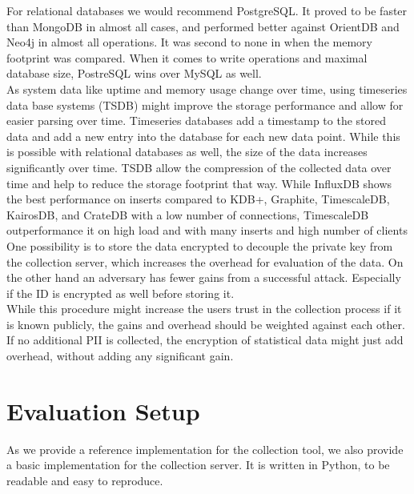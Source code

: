 For relational databases we would recommend PostgreSQL\cite{group_postgresql_2021}. It proved to be faster than MongoDB\cite{makris_mongodb_2020} in almost all cases, and performed better against OrientDB and Neo4j in almost all operations\cite{noauthor_benchmark_2018}. It was second to none in \cite{noauthor_benchmark_2018} when the memory footprint was compared.
When it comes to write operations and maximal database size, PostreSQL wins over MySQL as well\cite{noauthor_mysql_2021}.\\
As system data like uptime and memory usage change over time, using timeseries data base systems (TSDB) might improve the storage performance and allow for easier parsing over time. Timeseries databases add a timestamp to the stored data and add a new entry into the database for each new data point. While this is possible with relational databases as well, the size of the data increases significantly over time. TSDB allow the compression of the collected data over time and help to reduce the storage footprint that way. While InfluxDB shows the best performance on inserts  compared to KDB+\cite{}, Graphite\cite{}, TimescaleDB\cite{}, KairosDB\cite{}, and CrateDB\cite{} with a low number of connections\cite{}, TimescaleDB outperformance it on high load and with many inserts and high number of clients\cite{}
One possibility is to store the data encrypted to decouple the private key from the collection server, which increases the overhead for evaluation of the data. On the other hand an adversary has fewer gains from a successful attack. Especially if the ID is encrypted as well before storing it.\\
While this procedure might increase the users trust in the collection process if it is known publicly, the gains and overhead should be weighted against each other. If no additional PII is collected, the encryption of statistical data might just add overhead, without adding any significant gain.
%

\section{Evaluation Setup}
\label{sec:measurement:eval_setup}
%
As we provide a reference implementation for the collection tool, we also provide a basic implementation for the collection server\cite{}. It is written in Python, to be readable and easy to reproduce.


